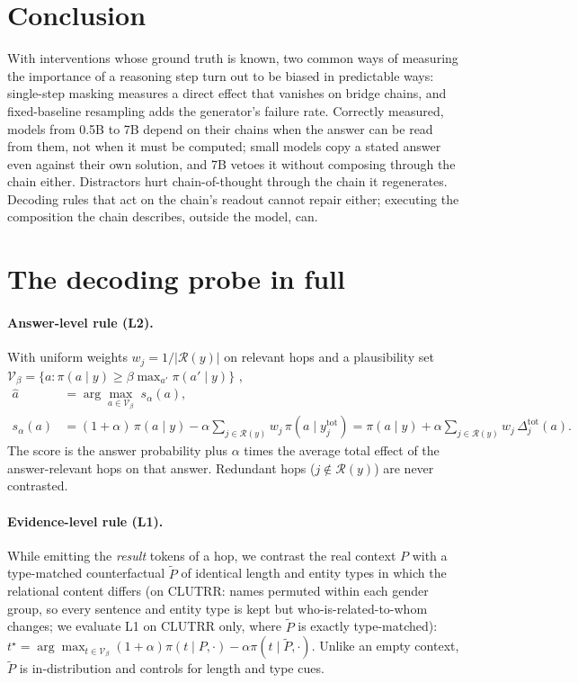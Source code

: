 \documentclass[11pt]{article}
\newcommand{\pa}{\pi}
\newcommand{\dotot}[1]{y^{\mathrm{tot}}_{#1}}
\newcommand{\Rel}{\mathcal{R}}
\begin{document}
\section{Conclusion}
With interventions whose ground truth is known, two common ways of measuring the importance of a
reasoning step turn out to be biased in predictable ways: single-step masking measures a direct
effect that vanishes on bridge chains, and fixed-baseline resampling adds the generator's failure
rate. Correctly measured, models from 0.5B to 7B depend on their chains when the answer can be read
from them, not when it must be computed; small models copy a stated answer even against their own
solution, and 7B vetoes it without composing through the chain either. Distractors hurt
chain-of-thought through the chain it regenerates. Decoding rules that act on the chain's readout
cannot repair either; executing the composition the chain describes, outside the model, can.




\appendix
\section{The decoding probe in full}
\label{app:method}

\paragraph{Answer-level rule (L2).} With uniform weights $w_j=1/|\Rel(y)|$ on relevant hops and a
plausibility set $\mathcal{V}_\beta=\{a:\pa(a\mid y)\ge\beta\max_{a'}\pa(a'\mid y)\}$
\citep{li2023contrastive},
\begin{equation}
\begin{aligned}
\hat a&=\arg\max_{a\in\mathcal{V}_\beta}\; s_\alpha(a),\\
s_\alpha(a)&=(1+\alpha)\,\pa(a\mid y)-\alpha\!\!\sum_{j\in\Rel(y)}\!\!w_j\,\pa(a\mid\dotot{j})
=\pa(a\mid y)+\alpha\!\!\sum_{j\in\Rel(y)}\!\!w_j\,\Delta^{\mathrm{tot}}_j(a).
\end{aligned}
\label{eq:hgcd}
\end{equation}
The score is the answer probability plus $\alpha$ times the average total effect of the
answer-relevant hops on that answer. Redundant hops ($j\notin\Rel(y)$) are never contrasted.

\paragraph{Evidence-level rule (L1).} While emitting the \emph{result} tokens of a hop, we contrast
the real context $P$ with a type-matched counterfactual $\tilde P$ of identical length and entity
types in which the relational content differs (on CLUTRR: names permuted within each gender
group, so every sentence and entity type is kept but who-is-related-to-whom changes; we evaluate
L1 on CLUTRR only, where $\tilde P$ is exactly type-matched):
$t^\star=\arg\max_{t\in\mathcal V_\beta}(1{+}\alpha)\pa(t\mid P,\cdot)-\alpha\pa(t\mid\tilde P,\cdot)$.
Unlike an empty context, $\tilde P$ is in-distribution and controls for length and type cues.
\end{document}
